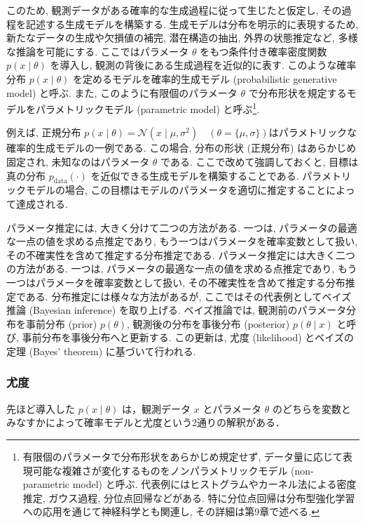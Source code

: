 \documentclass[titlepage]{ltjsbook}
\begin{document}
このため, 観測データがある確率的な生成過程に従って生じたと仮定し, その過程を記述する生成モデルを構築する. 生成モデルは分布を明示的に表現するため, 新たなデータの生成や欠損値の補完, 潜在構造の抽出, 外界の状態推定など, 多様な推論を可能にする. ここではパラメータ $\theta$ をもつ条件付き確率密度関数 $p(x \mid \theta)$ を導入し, 観測の背後にある生成過程を近似的に表す. このような確率分布 $p(x \mid \theta)$ を定めるモデルを確率的生成モデル (probabilistic generative model) と呼ぶ. また, このように有限個のパラメータ $\theta$ で分布形状を規定するモデルをパラメトリックモデル (parametric model) と呼ぶ\footnote{有限個のパラメータで分布形状をあらかじめ規定せず, データ量に応じて表現可能な複雑さが変化するものをノンパラメトリックモデル (non-parametric model) と呼ぶ. 代表例にはヒストグラムやカーネル法による密度推定, ガウス過程, 分位点回帰などがある. 特に分位点回帰は分布型強化学習への応用を通じて神経科学とも関連し, その詳細は第9章で述べる. }. 

例えば, 正規分布 $p(x \mid \theta) = \mathcal{N}(x \mid \mu, \sigma^2)\quad \left(\theta = \{\mu, \sigma\}\right)$はパラメトリックな確率的生成モデルの一例である. この場合, 分布の形状 (正規分布) はあらかじめ固定され, 未知なのはパラメータ $\theta$ である. ここで改めて強調しておくと, 目標は真の分布 $p_{\mathrm{data}}(\cdot)$ を近似できる生成モデルを構築することである. パラメトリックモデルの場合, この目標はモデルのパラメータを適切に推定することによって達成される. 

パラメータ推定には, 大きく分けて二つの方法がある. 一つは, パラメータの最適な一点の値を求める点推定であり, もう一つはパラメータを確率変数として扱い, その不確実性を含めて推定する分布推定である. 
パラメータ推定には大きく二つの方法がある. 一つは, パラメータの最適な一点の値を求める点推定であり, もう一つはパラメータを確率変数として扱い, その不確実性を含めて推定する分布推定である. 分布推定には様々な方法があるが, ここではその代表例としてベイズ推論 (Bayesian inference) を取り上げる. ベイズ推論では, 観測前のパラメータ分布を事前分布 (prior) $p(\theta)$, 観測後の分布を事後分布 (posterior) $p(\theta \mid x)$ と呼び, 事前分布を事後分布へと更新する. この更新は, 尤度 (likelihood) とベイズの定理 (Bayes’ theorem) に基づいて行われる. 

\subsubsection{尤度}
先ほど導入した $p(x \mid \theta)$ は，観測データ $x$ とパラメータ $\theta$ のどちらを変数とみなすかによって確率モデルと尤度という2通りの解釈がある．
\end{document}

